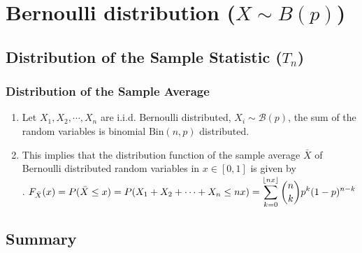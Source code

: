 \section{Bernoulli distribution ($X \sim B(p)$)}



\subsection{Distribution of the Sample Statistic ($T_n$)}

\subsubsection{Distribution of the Sample Average}

\begin{enumerate}
    \item Let $X_1 , X_2, \cdots , X _n$ are i.i.d. Bernoulli distributed, $X _i \sim \mathcal{B} ( p)$, the sum of the random variables is binomial $\text{Bin} (n, p)$ distributed.
    \hfill \cite{statistics/book/Statistics-for-Data-Scientists/Maurits-Kaptein}

    \item This implies that the distribution function of the sample average $\bar{X}$ of Bernoulli distributed random variables in $x \in [0, 1]$ is given by
    \hfill \cite{statistics/book/Statistics-for-Data-Scientists/Maurits-Kaptein}
    \\
    .\hfill
    $
        F _{\bar{X}} (x)
        = P ( \bar{X} \leq x)
        = P (X_1 + X_2 + \cdots + X _n \leq nx)
        = \displaystyle\sum ^{\left \lfloor nx \right \rfloor} _{k=0} \dbinom{n}{k} p ^k (1 - p)^{n-k}
    $
    \hfill \cite{statistics/book/Statistics-for-Data-Scientists/Maurits-Kaptein}


\end{enumerate}




\subsection{Summary}

